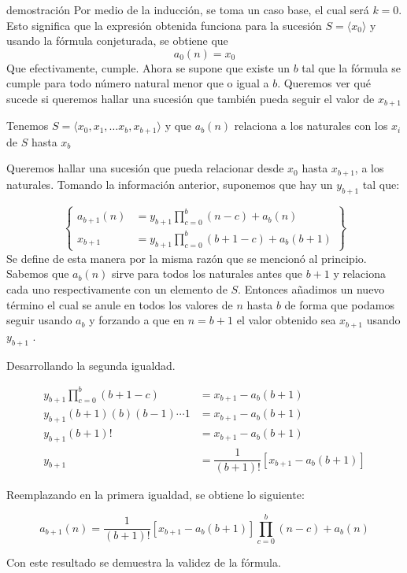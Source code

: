\documentclass{article}
\begin{document}
\begin{subproofbox}{demostración}
    Por medio de la inducción, se toma un caso base, el cual será $k=0$. Esto significa que la expresión obtenida funciona para la sucesión $S = \langle x_0\rangle$
    y usando la fórmula conjeturada, se obtiene que
    \[a_0(n) = x_0 \]
    Que efectivamente, cumple.
    Ahora se supone que existe un $b$ tal que la fórmula se cumple para todo número natural menor que o igual a $b$. Queremos ver qué sucede si queremos hallar una sucesión que también pueda seguir el valor de $x_{b+1}$

    Tenemos $S = \langle x_0, x_1, \dots x_b, x_{b+1}\rangle$
    y que $a_b(n)$ relaciona a los naturales con los $x_i$ de $S$ hasta $x_b$

    Queremos hallar una sucesión que pueda relacionar desde $x_0$ hasta $x_{b+1}$, a los naturales. Tomando la información anterior, suponemos que hay un $y_{b+1}$ tal que:

    \begin{equation*}
        \left\{
            \begin{aligned}
                a_{b+1}(n) &= y_{b+1} \displaystyle\prod_{c=0}^{b}(n-c) + a_b(n)\\
                x_{b+1} &= y_{b+1} \displaystyle\prod_{c=0}^{b}(b+1 - c) + a_b(b + 1)                
            \end{aligned}
        \right\}
    \end{equation*}
    Se define de esta manera por la misma razón que se mencionó al principio. Sabemos que $a_b(n)$ sirve para todos los naturales antes que $b+1$ y relaciona cada uno respectivamente con un elemento de $S$. Entonces añadimos un nuevo término el cual se anule en todos los valores de $n$ hasta $b$ de forma que podamos seguir usando $a_b$ y forzando a que en $n=b+1$ el valor obtenido sea $x_{b+1}$ usando $y_{b+1}$ .

    Desarrollando la segunda igualdad.

    \begin{align*}
        y_{b+1} \displaystyle\prod_{c=0}^{b}(b+1 - c) &= x_{b+1} - a_b(b+1)\\
        y_{b+1} (b+1)(b)(b-1)\cdots 1 &= x_{b+1} - a_b(b+1)\\
        y_{b+1} (b+1)! &= x_{b+1} - a_b(b+1)\\
        y_{b+1} &= \dfrac{1}{(b+1)!}[x_{b+1} - a_b(b+1)]
    \end{align*}

    Reemplazando en la primera igualdad, se obtiene lo siguiente:

    \[a_{b+1}(n) = \dfrac{1}{(b+1)!}[x_{b+1} - a_b(b+1)]\displaystyle\prod_{c=0}^{b}(n-c) + a_b(n)\]

    Con este resultado se demuestra la validez de la fórmula.
\end{subproofbox}
\end{document}
